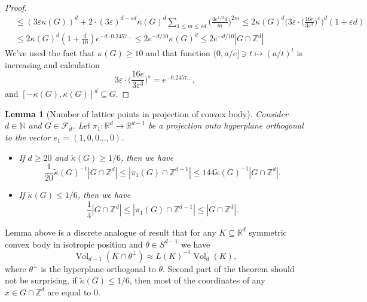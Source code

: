 \documentclass[10pt,a4paper]{amsart}
\numberwithin{equation}{section}
\newtheorem{Lem}[Thm]{Lemma}
\newcommand{\Z}{\mathbb{Z}}
\newcommand{\R}{\mathbb{R}}
\newcommand{\N}{\mathbb{N}}
\DeclareMathOperator{\Vol}{Vol}
\begin{document}
\begin{proof}
\begin{equation}
\begin{split}
    &\le (3\varepsilon \kappa(G))^d+2 \cdot (3\varepsilon)^{d-\varepsilon d} \kappa(G)^d \sum_{1 \le m \le \varepsilon d}  \Big( \frac{4 e^{1/2}d}{m} \Big)^{2m} \le 2 \kappa(G)^d \Big( 3 \varepsilon \cdot \Big(\frac{16e}{3\varepsilon^3} \Big)^{\varepsilon} \Big)^d (1+ \varepsilon d) \\
    &\le 2 \kappa(G)^d (1+ \frac{d}{10}) e^{-d \cdot 0.2457...} \le 2 e^{-d/10}  \kappa(G)^d \le 2 e^{-d/10} |G \cap \Z^d|
    \end{split}
\end{equation}
We've used the fact that $\kappa(G) \ge 10$ and that function $(0,a/e] \ni t \mapsto (a/t)^t$ is increasing and calculation
\[
3 \varepsilon \cdot \Big(\frac{16e}{3\varepsilon^3} \Big)^{\varepsilon}=e^{- 0.2457...},
\]
and $[-\kappa(G), \kappa(G)]^d \subseteq G$.
\end{proof}
\begin{Lem}[Number of lattice points in projection of convex body] \label{dim_comp}
    Consider $d \in \N$ and $G \in \mathcal{F}_d$. Let $\pi_1 : \R^d \to \R^{d-1}$ be a projection onto hyperplane orthogonal to the vector $e_1=(1,0,0 \ldots, 0)$.
    \begin{itemize}
        \item If $d \ge 20$ and $\widetilde{\kappa}(G) \ge 1/6$, then we have
    \[
   \frac{1}{20} \widetilde{\kappa}(G)^{-1} |G \cap \Z^d| \le | \pi_1(G) \cap \Z^{d-1} | \le 144 \widetilde{\kappa}(G)^{-1} |G \cap \Z^d|.
    \]
    \item If $\widetilde{\kappa}(G) \le 1/6$, then we have
    \[
   \frac{1}{4} |G \cap \Z^d| \le | \pi_1(G) \cap \Z^{d-1} | \le  |G \cap \Z^d|.
    \]
    \end{itemize}
\end{Lem}
Lemma above is a discrete analogue of result that for any $K \subseteq \R^d$ symmetric convex body in isotropic position and $\theta \in S^{d-1}$ we have
    \[
    \Vol_{d-1}(K \cap \theta^\perp) \approx L(K)^{-1} \Vol_d(K),
    \]
    where $\theta^\perp$ is the hyperplane orthogonal to $\theta$.
Second part of the theorem should not be surprising, if $\widetilde{\kappa}(G) \le 1/6$, then most of the coordinates of any $x \in G \cap \Z^d$ are equal to $0$.
\end{document}
